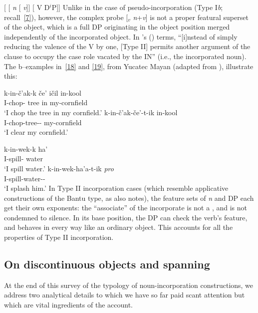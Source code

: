 \documentclass[output=paper]{langsci/langscibook}
\begin{document}
\begin{refcontext}
\ea  {}[ [ \emph{n}\tss{\{[+N]\}} [ \hspace{-.7ex}\emph{v}\tss{\{[+V], \Acc{}, \ldots{}\}}]]\tss{\{\{[+N]\}, \{[+V], \Acc{}, \ldots{}\}\}} [ V D$^i$P]]\label{17}
\z
Unlike in the case of pseudo-incorporation (Type I\emph{b}; recall~\eqref{7}),
however, the complex probe [$_v$ \emph{n}+\emph{v}] is not a proper featural
superset of the object, which is a full DP originating in the object position
merged independently of the incorporated object. In \citeauthor{mithun84}'s
(\citeyear[859]{mithun84}) terms, \enquote{[i]nstead of simply reducing the
valence of the V by one, [Type II] permits another argument of the clause to
occupy the case role vacated by the IN} (i.e., the incorporated noun). The
b–examples in~\eqref{18} and \eqref{19}, from Yucatec Mayan (adapted from
\citealt[858]{mithun84}), illustrate this:

\ea\label{18}
    \ea \gll k-in-\v{c}'ak-k \v{c}e' i\v{c}il in-kool\\
    \Incmpl{}\normalfont{-}I-chop-\Ipfv{} tree in my-cornfield\\
    \glt \enquote*{I chop the tree in my cornfield.}
    \ex \gll k-in-\v{c}'ak-\v{c}e'-t-ik in-kool\\
    \Incmpl{}\normalfont{-}I-chop-tree-\Tr-\Ipfv{} my-cornfield\\
    \glt \enquote*{I clear my cornfield.}
    \z
\z

\ea\label{19}
    \ea \gll k-in-wek-k ha'\\
    \Incmpl{}\normalfont{-}I-spill-\Ipfv{} water\\
    \glt \enquote*{I spill water.}
    \ex \gll k-in-wek-ha'a-t-ik \emph{pro}\\
    \Incmpl{}\normalfont{-}I-spill-water-\Tr-\Ipfv{}\\
    \glt \enquote*{I splash him.}
    \z
\z
In Type II incorporation cases (which resemble applicative constructions of the
Bantu type, as \cite{rosen89} also notes), the feature sets of \emph{n} and DP
each get their own exponents: the \enquote{associate} of the incorporate is
not a , and is not condemned to silence. In its base position,
the DP can check the verb's  feature, and behaves in every way
like an ordinary object. This accounts for all the properties of Type II
incorporation.

\subsection{On discontinuous objects and spanning}
\label{sec:16.2.4}
At the end of this survey of the typology of noun-incorporation constructions, we address two analytical
details to which we have so far paid scant attention but which are vital ingredients of the account.



\end{refcontext}
\end{document}
